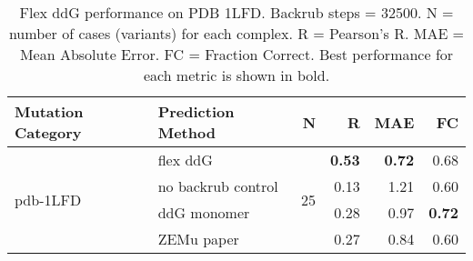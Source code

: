 \begin{table}
  \begin{tabular}{llrrrr}
\toprule
Mutation Category &   Prediction Method &   N &    R &  MAE &   FC \\
\midrule
 \multirow{ 4}{*}{pdb-1LFD} & flex ddG & \multirow{ 4}{*}{25} & \textbf{0.53} & \textbf{0.72} & 0.68  \\
 & no backrub control & & 0.13 & 1.21 & 0.60  \\
 & ddG monomer & & 0.28 & 0.97 & \textbf{0.72}  \\
 & ZEMu paper & & 0.27 & 0.84 & 0.60  \\
\bottomrule
\end{tabular}
  \caption[Flex ddG performance on PDB 1LFD]{
    Flex ddG performance on PDB 1LFD. Backrub steps = 32500. N = number of cases (variants) for each complex. R = Pearson's R. MAE = Mean Absolute Error. FC = Fraction Correct. Best performance for each metric is shown in bold.
  } \label{tab:table-pdb-1LFD}
\end{table}
